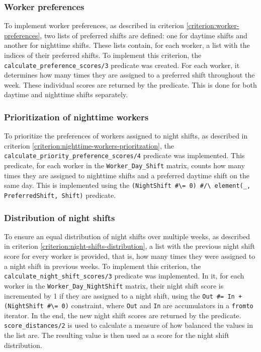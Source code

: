 \documentclass[conference]{IEEEtran}
\def\constraint#1{\vspace{4pt} {#1}}
\begin{document}
\constraint {
    \subsubsection*{Worker preferences}
    To implement worker preferences, as described in criterion \ref{criterion:worker-preferences}, two lists of preferred shifts are defined: one for daytime shifts and another for nighttime shifts. These lists contain, for each worker, a list with the indices of their preferred shifts.
    To implement this criterion, the \texttt{calculate\_preference\_scores/3} predicate was created. For each worker, it determines how many times they are assigned to a preferred shift throughout the week. These individual scores are returned by the predicate. This is done for both daytime and nighttime shifts separately.
}

\constraint {
    \subsubsection*{Prioritization of nighttime workers}
    To prioritize the preferences of workers assigned to night shifts, as described in criterion \ref{criterion:nighttime-workers-prioritzation}, the \texttt{calculate\_priority\_preference\_scores/4} predicate was implemented. This predicate, for each worker in the \texttt{Worker\_Day\_Shift} matrix, counts how many times they are assigned to nighttime shifts and a preferred daytime shift on the same day. This is implemented using the \texttt{(NightShift \#\textbackslash= 0) \#/\textbackslash\ element(\_, PreferredShift, Shift)} predicate.
}

\constraint {
    \subsubsection*{Distribution of night shifts}
    To ensure an equal distribution of night shifts over multiple weeks, as described in criterion \ref{criterion:night-shifts-distribution}, a list with the previous night shift score for every worker is provided, that is, how many times they were assigned to a night shift in previous weeks.
    To implement this criterion, the \texttt{calculate\_night\_shift\_scores/3} predicate was implemented. In it, for each worker in the \texttt{Worker\_Day\_NightShift} matrix, their night shift score is incremented by 1 if they are assigned to a night shift, using the \texttt{Out \#= In + (NightShift \#\textbackslash= 0)} constraint, where \texttt{Out} and \texttt{In} are accumulators in a \texttt{fromto} iterator. In the end, the new night shift scores are returned by the predicate. \texttt{score\_distances/2} is used to calculate a measure of how balanced the values in the list are. The resulting value is then used as a score for the night shift distribution.
}
\end{document}
